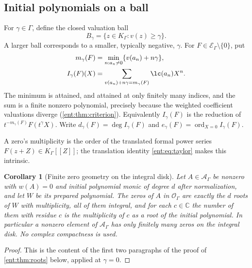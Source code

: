 \documentclass[11pt]{article}
\theoremstyle{plain}
\theoremstyle{plain}
\theoremstyle{plain}
\newtheorem{corollary}[corollary]{Corollary}
\theoremstyle{definition}
\theoremstyle{definition}
\theoremstyle{definition}
\theoremstyle{definition}
\theoremstyle{remark}
\newcommand{\C}{\mathbb C}\newcommand{\R}{\mathbb R}
\newcommand{\K}{K_\Gamma}\newcommand{\KD}{K_\Delta}
\newcommand{\E}{\mathcal E_\Gamma}
\newcommand{\A}{\mathcal A_\Gamma}\newcommand{\OO}{\mathcal O_\Gamma}
\DeclareMathOperator{\ord}{ord}\DeclareMathOperator{\cf}{cf}
\begin{document}
\subsection{Initial polynomials on a ball}
For $\gamma\in\Gamma$, define the closed valuation ball
\[
 B_\gamma=\{z\in\K:v(z)\ge\gamma\}.
\]
A larger ball corresponds to a smaller, typically negative, $\gamma$. For
$F\in\E\setminus\{0\}$, put
\begin{align}
 m_\gamma(F)&=\min_{n:a_n\ne0}\{v(a_n)+n\gamma\},\label{ent:eq:weighted}\\
 I_\gamma(F)(X)&=
 \sum_{v(a_n)+n\gamma=m_\gamma(F)}\lc(a_n)X^n.
 \label{ent:eq:initial}
\end{align}
The minimum is attained, and attained at only finitely many indices, and the
sum is a finite nonzero polynomial, precisely because the weighted
coefficient valuations diverge (\cref{ent:thm:criterion}). Equivalently
$I_\gamma(F)$ is the reduction of $t^{-m_\gamma(F)}F(t^\gamma X)$. Write
$d_\gamma(F)=\deg I_\gamma(F)$ and $e_\gamma(F)=\ord_{X=0}I_\gamma(F)$.

A zero's multiplicity is the order of the translated formal power series
$F(z+Z)\in\K[[Z]]$; the translation identity \eqref{ent:eq:taylor} makes this
intrinsic.

\begin{corollary}[Finite zero geometry on the integral disk]
\label{ent:cor:integral-zeros}
Let $A\in\A$ be nonzero with $w(A)=0$ and initial polynomial monic of degree
$d$ after normalization, and let $W$ be its prepared polynomial. The zeros of
$A$ in $\OO$ are exactly the $d$ roots of $W$ with multiplicity, all of them
integral, and for each $c\in\C$ the number of them with residue $c$ is the
multiplicity of $c$ as a root of the initial polynomial. In particular a
nonzero element of $\A$ has only finitely many zeros on the integral disk.
No complex compactness is used.
\end{corollary}
\begin{proof}
This is the content of the first two paragraphs of the proof of
\cref{ent:thm:roots} below, applied at $\gamma=0$.
\end{proof}
\end{document}
